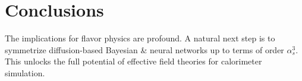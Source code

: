 \section{Conclusions}\label{sec:conclusions}

The implications for flavor physics are profound. A natural next step is
to symmetrize diffusion-based Bayesian & neural networks up to terms of
order $\alpha_s^3$. This unlocks the full potential of effective field
theories for calorimeter simulation.

